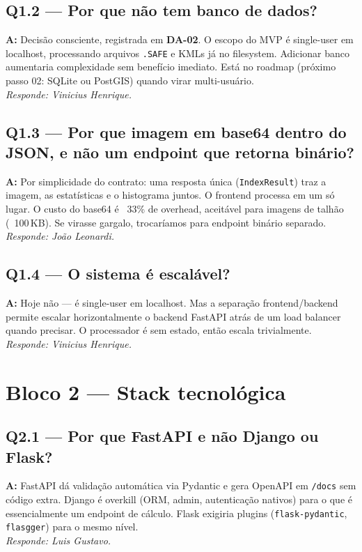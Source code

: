 \documentclass[12pt,a4paper]{article}
\begin{document}
\subsection*{Q1.2 — Por que não tem banco de dados?}
\textbf{A:} Decisão consciente, registrada em \textbf{DA-02}. O escopo do MVP
é single-user em localhost, processando arquivos \texttt{.SAFE} e KMLs já no
filesystem. Adicionar banco aumentaria complexidade sem benefício imediato.
Está no roadmap (próximo passo 02: SQLite ou PostGIS) quando virar
multi-usuário.
\\[2pt] \textit{Responde: Vinicius Henrique.}

\subsection*{Q1.3 — Por que imagem em base64 dentro do JSON, e não um endpoint que retorna binário?}
\textbf{A:} Por simplicidade do contrato: uma resposta única
(\texttt{IndexResult}) traz a imagem, as estatísticas e o histograma juntos.
O frontend processa em um só lugar. O custo do base64 é ~33\% de overhead,
aceitável para imagens de talhão (~100\,KB). Se virasse gargalo, trocaríamos
para endpoint binário separado.
\\[2pt] \textit{Responde: João Leonardi.}

\subsection*{Q1.4 — O sistema é escalável?}
\textbf{A:} Hoje não — é single-user em localhost. Mas a separação
frontend/backend permite escalar horizontalmente o backend FastAPI atrás de
um load balancer quando precisar. O processador é sem estado, então
escala trivialmente.
\\[2pt] \textit{Responde: Vinicius Henrique.}

\section*{Bloco 2 — Stack tecnológica}

\subsection*{Q2.1 — Por que FastAPI e não Django ou Flask?}
\textbf{A:} FastAPI dá validação automática via Pydantic e gera OpenAPI em
\texttt{/docs} sem código extra. Django é overkill (ORM, admin, autenticação
nativos) para o que é essencialmente um endpoint de cálculo. Flask exigiria
plugins (\texttt{flask-pydantic}, \texttt{flasgger}) para o mesmo nível.
\\[2pt] \textit{Responde: Luis Gustavo.}
\end{document}
